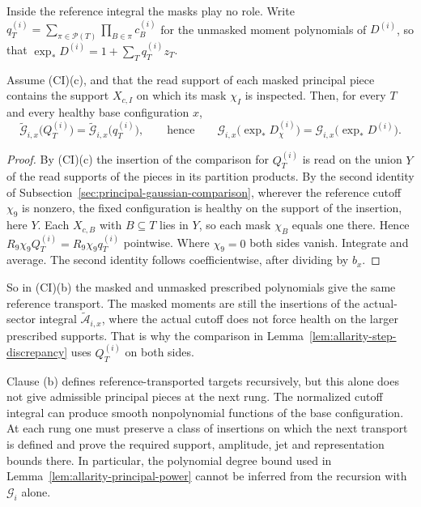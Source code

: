 Inside the reference integral the masks play no role. Write
$q^{(i)}_T=\sum_{\pi\in\mathcal P(T)}\prod_{B\in\pi}c^{(i)}_B$ for the
unmasked moment polynomials of $D^{(i)}$, so that
$\exp_*D^{(i)}=1+\sum_Tq^{(i)}_Tz_T$.

\begin{lemma}
\label{lem:allarity-reference-mask-removal}
Assume (CI)(c), and that the read support of each masked principal piece
contains the support $X_{c,I}$ on which its mask $\chi_I$ is inspected.
Then, for every $T$ and every healthy base configuration $x$,
\[
 \widetilde{\mathcal G}_{i,x}\bigl(Q^{(i)}_T\bigr)
   =\widetilde{\mathcal G}_{i,x}\bigl(q^{(i)}_T\bigr),
 \qquad\text{hence}\qquad
 \mathcal G_{i,x}\bigl(\exp_*D^{(i)}_\chi\bigr)
   =\mathcal G_{i,x}\bigl(\exp_*D^{(i)}\bigr).
\]
\end{lemma}
\begin{proof}
By (CI)(c) the insertion of the comparison for $Q^{(i)}_T$ is read on the
union $Y$ of the read supports of the pieces in its partition products. By
the second identity of Subsection~\ref{sec:principal-gaussian-comparison},
wherever the reference cutoff $\chi_9$ is nonzero, the fixed configuration
is healthy on the support of the insertion, here $Y$. Each $X_{c,B}$ with
$B\subseteq T$ lies in $Y$, so each mask $\chi_B$ equals one there. Hence
$R_9\chi_9Q^{(i)}_T=R_9\chi_9q^{(i)}_T$ pointwise. Where $\chi_9=0$ both
sides vanish. Integrate and average. The second identity follows
coefficientwise, after dividing by $b_x$.
\end{proof}

So in (CI)(b) the masked and unmasked prescribed polynomials give the
same reference transport. The masked moments are still the insertions of
the actual-sector integral $\widetilde{\mathcal A}_{i,x}$, where the
actual cutoff does not force health on the larger prescribed supports.
That is why the comparison in Lemma~\ref{lem:allarity-step-discrepancy}
uses $Q^{(i)}_T$ on both sides.

Clause (b) defines reference-transported targets recursively, but this
alone does not give admissible principal pieces at the next rung.
The normalized cutoff integral can produce smooth nonpolynomial
functions of the base configuration. At each rung one must preserve a
class of insertions on which the next transport is defined and prove
the required support, amplitude, jet and representation bounds there.
In particular, the polynomial degree bound used in
Lemma~\ref{lem:allarity-principal-power} cannot be inferred from the
recursion with $\mathcal G_i$ alone.

